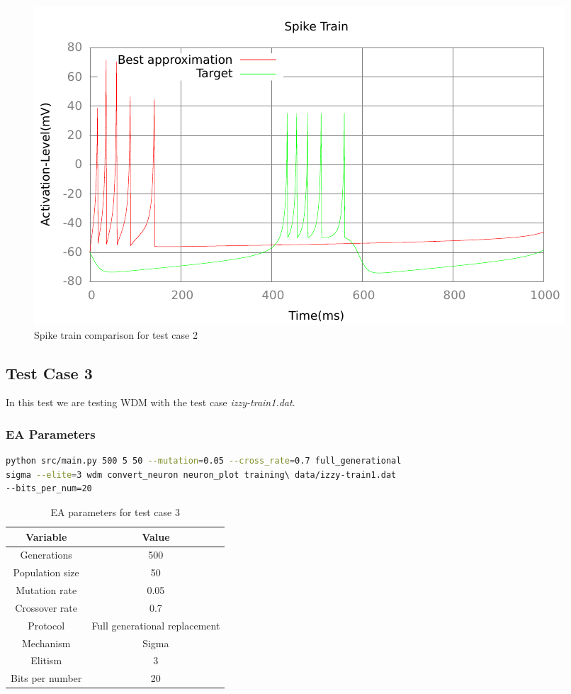 \begin{figure}[h]
	\centering
	\includegraphics{../output/sidm_izzy_1_spike.pdf}
	\caption{Spike train comparison for test case 2}
	\label{fig:spike-test-case-2}
\end{figure}

\subsection{Test Case 3}\label{sec:test-case-3}
In this test we are testing WDM with the test case
\textit{izzy-train1.dat}.
\subsubsection{EA Parameters}\label{sec:test-case-3-parameters}
\begin{lstlisting}[frame=single, language=bash, caption=Command-line to
replicate the results]
python src/main.py 500 5 50 --mutation=0.05 --cross_rate=0.7 full_generational
sigma --elite=3 wdm convert_neuron neuron_plot training\ data/izzy-train1.dat
--bits_per_num=20
\end{lstlisting}
\begin{table}
	\begin{tabular}{c c}
		Variable & Value \\
		\hline
		Generations & 500 \\
		\hline
		Population size & 50 \\
		\hline
		Mutation rate & 0.05 \\
		\hline
		Crossover rate & 0.7 \\
		\hline
		Protocol & Full generational replacement \\
		\hline
		Mechanism & Sigma \\
		\hline
		Elitism & 3 \\
		\hline
		Bits per number & 20 \\
	\end{tabular}
	\caption{EA parameters for test case 3}
\end{table}
